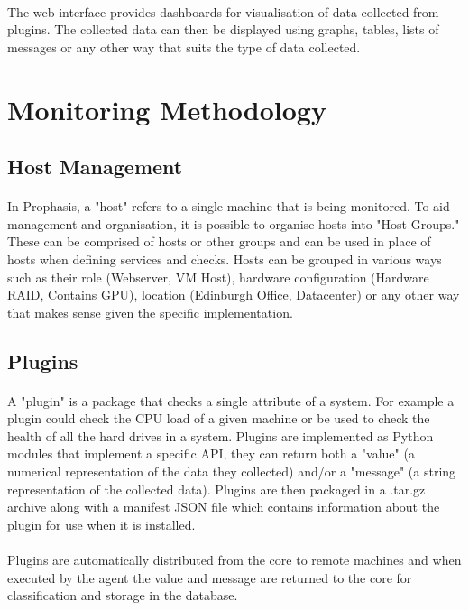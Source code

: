 \documentclass[bsc,logo,twoside]{infthesis}
\begin{document}
\paragraph*{}
	The web interface provides dashboards for visualisation of data collected from
	plugins.  The collected data can then be displayed using graphs, tables, lists
	of messages or any other way that suits the type of data collected.

\section{Monitoring Methodology}
\subsection{Host Management}
\paragraph*{}
	In Prophasis, a "host" refers to a single machine that is being monitored.
	To aid management and organisation, it is possible to organise hosts into
	"Host Groups."  These can be comprised of hosts or other groups and can be
	used in place of hosts when defining services and checks.  Hosts can be
	grouped in various ways such as their role (Webserver, VM Host), hardware
	configuration (Hardware RAID, Contains GPU), location (Edinburgh Office,
	Datacenter) or any other way that makes sense given the specific
	implementation.

\subsection{Plugins}
\paragraph*{}
	A "plugin" is a package that checks a single attribute of a system.  For
	example a plugin could check the CPU load of a given machine or be used 
	to check the health of all the hard drives in a system.  Plugins are
	implemented as Python modules that implement a specific API, they can return
	both a "value" (a numerical representation of the data they collected) and/or
	a "message" (a string representation of the collected data).  Plugins are
	then packaged in a .tar.gz archive along with a manifest JSON file which 
	contains information about the plugin for use when it is installed.
	
\paragraph*{}
	Plugins are automatically distributed from the core to remote machines and
	when executed by the agent the value and message are returned to the core for
	classification and storage in the database.
\end{document}

